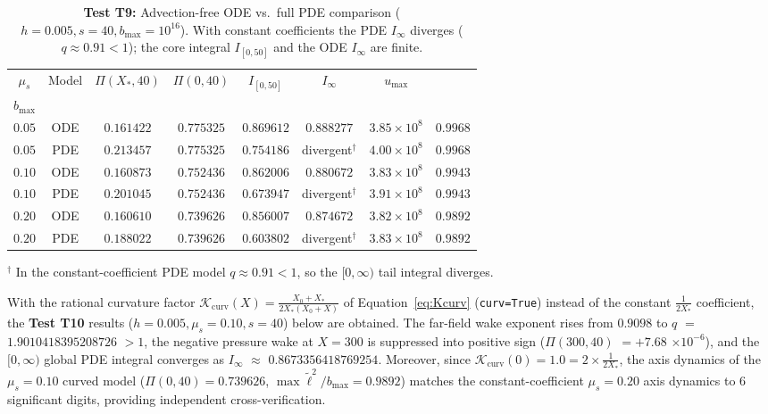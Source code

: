 \documentclass[12pt,a4paper]{article}
\begin{document}
\begin{table}[htbp]
\centering
\footnotesize
\setlength{\tabcolsep}{1pt}
\caption{\textbf{Test T9:} Advection-free ODE vs.\ full PDE comparison ($h=0.005, s=40, b_{\max}=10^{16}$). With constant coefficients the PDE $I_\infty$ diverges ($q\approx 0.91 < 1$); the core integral $I_{[0,50]}$ and the ODE $I_\infty$ are finite.}
\vspace{0.1cm}
\begin{tabular}{@{}c|c|cc|cc|c|c@{}}
\hline
$\mu_s$ & Model & $\Pi(X_*,40)$ & $\Pi(0,40)$ & $I_{[0,50]}$ & $I_\infty$ & $u_{\max}$ & \shortstack{$\max \tilde{\ell}^2/$ \\ $b_{\max}$} \\
\hline
$0.05$ & ODE & $0.161422$ & $0.775325$ & $0.869612$ & $0.888277$ & $3.85\times 10^{8}$ & $0.9968$ \\
$0.05$ & PDE & $0.213457$ & $0.775325$ & $0.754186$ & divergent$^\dagger$ & $4.00\times 10^{8}$ & $0.9968$ \\
$0.10$ & ODE & $0.160873$ & $0.752436$ & $0.862006$ & $0.880672$ & $3.83\times 10^{8}$ & $0.9943$ \\
$0.10$ & PDE & $0.201045$ & $0.752436$ & $0.673947$ & divergent$^\dagger$ & $3.91\times 10^{8}$ & $0.9943$ \\
$0.20$ & ODE & $0.160610$ & $0.739626$ & $0.856007$ & $0.874672$ & $3.82\times 10^{8}$ & $0.9892$ \\
$0.20$ & PDE & $0.188022$ & $0.739626$ & $0.603802$ & divergent$^\dagger$ & $3.83\times 10^{8}$ & $0.9892$ \\
\hline
\end{tabular}

{\footnotesize $^\dagger$ In the constant-coefficient PDE model $q \approx 0.91 < 1$, so the $[0,\infty)$ tail integral diverges.\par}
\end{table}

{
With the rational curvature factor $\mathcal{K}_{\mathrm{curv}}(X) = \frac{X_0+X_*}{2X_*(X_0+X)}$ of Equation~\eqref{eq:Kcurv} (\texttt{curv=True}) instead of the constant $\frac{1}{2X_*}$ coefficient, the \textbf{Test T10} results ($h=0.005, \mu_s=0.10, s=40$) below are obtained. The far-field wake exponent rises from $0.9098$ to $q$ $=$ $1.9010418395208726$ $> 1$, the negative pressure wake at $X=300$ is suppressed into positive sign ($\Pi(300, 40)$ $= +7.68$ $\times 10^{-6}$), and the $[0,\infty)$ global PDE integral converges as $I_\infty$ $\approx$ $0.8673356418769254$. Moreover, since $\mathcal{K}_{\mathrm{curv}}(0) = 1.0 = 2 \times \frac{1}{2X_*}$, the axis dynamics of the $\mu_s = 0.10$ curved model ($\Pi(0,40) = 0.739626$, $\max \tilde{\ell}^2/b_{\max} = 0.9892$) matches the constant-coefficient $\mu_s = 0.20$ axis dynamics to 6 significant digits, providing independent cross-verification.
\par}
\end{document}
